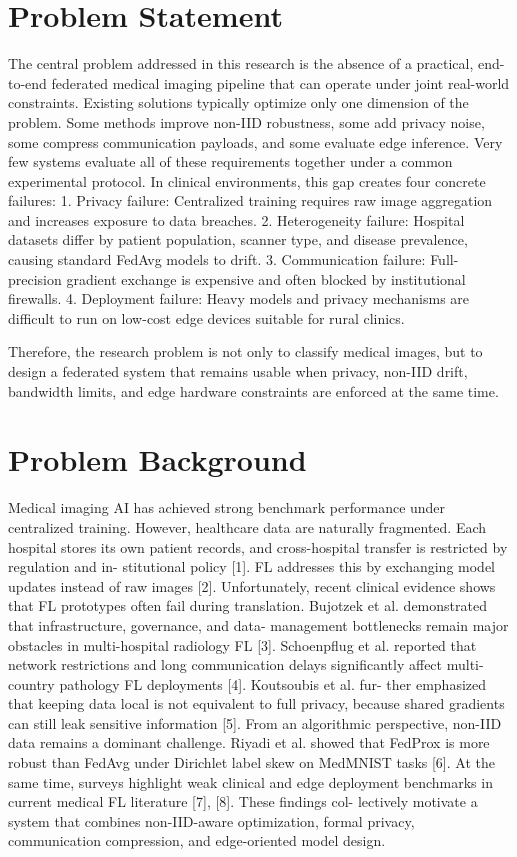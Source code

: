 \documentclass[12pt,a4paper]{report}
\begin{document}
\section{Problem Statement}
The central problem addressed in this research is the absence of a practical, end-to-end federated medical imaging pipeline that can operate under joint real-world constraints.
Existing solutions typically optimize only one dimension of the problem. Some methods improve non-IID robustness, some add privacy noise, some compress communication payloads, and some evaluate edge inference. Very few systems evaluate all of these requirements together under a common experimental protocol.
In clinical environments, this gap creates four concrete failures:
1. Privacy failure: Centralized training requires raw image aggregation and increases exposure to data breaches.
2. Heterogeneity failure: Hospital datasets differ by patient population, scanner type, and disease prevalence, causing standard FedAvg models to drift.
3. Communication failure: Full-precision gradient exchange is expensive and often blocked by institutional firewalls.
4. Deployment failure: Heavy models and privacy mechanisms are difficult to run on low-cost edge devices suitable for rural clinics.

Therefore, the research problem is not only to classify medical images, but to design a federated system that remains usable when privacy, non-IID drift, bandwidth limits, and edge hardware constraints are enforced at the same time.
\section{Problem Background}
Medical imaging AI has achieved strong benchmark performance under centralized training.
However, healthcare data are naturally fragmented.
Each hospital stores its own patient records, and cross-hospital transfer is restricted by regulation and in- stitutional policy [1]. FL addresses this by exchanging model updates instead of raw images [2].
Unfortunately, recent clinical evidence shows that FL prototypes often fail during translation. Bujotzek et al. demonstrated that infrastructure, governance, and data- management bottlenecks remain major obstacles in multi-hospital radiology FL [3].
Schoenpflug et al. reported that network restrictions and long communication delays significantly affect multi-country pathology FL deployments [4]. Koutsoubis et al. fur- ther emphasized that keeping data local is not equivalent to full privacy, because shared gradients can still leak sensitive information [5].
From an algorithmic perspective, non-IID data remains a dominant challenge. Riyadi et al. showed that FedProx is more robust than FedAvg under Dirichlet label skew on
MedMNIST tasks [6].
At the same time, surveys highlight weak clinical and edge deployment benchmarks in current medical FL literature [7], [8]. These findings col- lectively motivate a system that combines non-IID-aware optimization, formal privacy, communication compression, and edge-oriented model design.
\newpage
\end{document}
